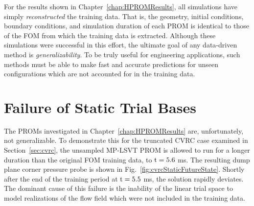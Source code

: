 For the results shown in Chapter~\ref{chap:HPROMResults}, all simulations have simply \textit{reconstructed} the training data. That is, the geometry, initial conditions, boundary conditions, and simulation duration of each PROM is identical to those of the FOM from which the training data is extracted. Although these simulations were successful in this effort, the ultimate goal of any data-driven method is \textit{generalizability}. To be truly useful for engineering applications, such methods must be able to make fast and accurate predictions for unseen configurations which are not accounted for in the training data. 

\section{Failure of Static Trial Bases}

The PROMs investigated in Chapter~\ref{chap:HPROMResults} are, unfortunately, not generalizable. To demonstrate this for the truncated CVRC case examined in Section~\ref{sec:cvrc}, the unsampled MP-LSVT PROM is allowed to run for a longer duration than the original FOM training data, to $\text{t} = 5.6$ ms. The resulting dump plane corner pressure probe is shown in Fig.~\ref{fig:cvrcStaticFutureState}. Shortly after the end of the training period at $\text{t} = 5.5$ ms, the solution rapidly deviates. The dominant cause of this failure is the inability of the linear trial space to model realizations of the flow field which were not included in the training data.

